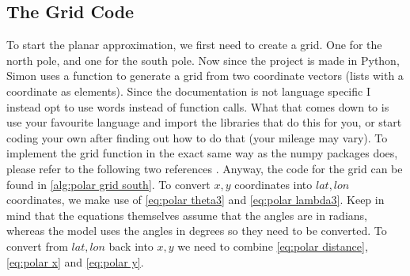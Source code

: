 \subsection{The Grid Code}
To start the planar approximation, we first need to create a grid. One for the north pole, and one for the south pole. Now since the project is made in Python, Simon uses a function to generate 
a grid from two coordinate vectors (lists with a coordinate as elements). Since the documentation is not language specific I instead opt to use words instead of function calls. What that comes 
down to is use your favourite language and import the libraries that do this for you, or start coding your own after finding out how to do that (your mileage may vary). To implement the grid 
function in the exact same way as the numpy packages does, please refer to the following two references \cite{meshgridDoc} \cite{meshgridGFG}. Anyway, the code for the grid can be found in 
\autoref{alg:polar grid south}. To convert $x, y$ coordinates into $lat, lon$ coordinates, we make use of \autoref{eq:polar theta3} and \autoref{eq:polar lambda3}. Keep in mind that the equations 
themselves assume that the angles are in radians, whereas the model uses the angles in degrees so they need to be converted. To convert from $lat, lon$ back into $x, y$ we need to combine 
\autoref{eq:polar distance}, \autoref{eq:polar x} and \autoref{eq:polar y}.

